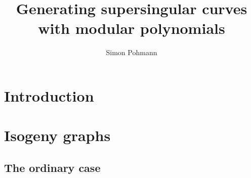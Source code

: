 \documentclass{ociamthesis}
\title{Generating supersingular curves with modular polynomials}
\author{Simon Pohmann}
\theoremstyle{definition}
\begin{document}
\maketitle

\tableofcontents

\chapter{Introduction}

\chapter{Isogeny graphs}

\section{The ordinary case}
\end{document}
